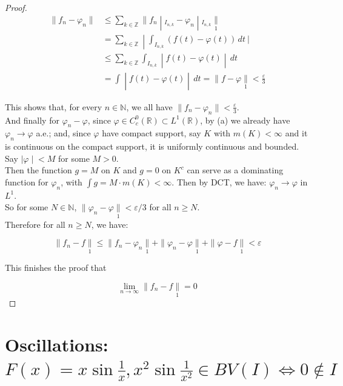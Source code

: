 \begin{proof}
\[\begin{matrix}
{\parallel f_{n} - \varphi_{n} \parallel} & \left. \leq \sum\limits_{k \in \mathbb{Z}} \parallel f_{n} \middle| {}_{I_{n,k}} - \varphi_{n} \middle| {}_{I_{n,k}}\underset{1}{\parallel} \right. \\
 & \left. = \sum\limits_{k \in \mathbb{Z}} \middle| \int_{I_{n,k}}(f(t) - \varphi(t))\, dt\ | \right. \\
 & \left. \leq \sum\limits_{k \in \mathbb{Z}}\int_{I_{n,k}} \middle| f(t) - \varphi(t) \middle| \, dt \right. \\
 & \left. = \int \middle| f(t) - \varphi(t) \middle| \, dt = \parallel f - \varphi\underset{1}{\parallel} < \frac{\varepsilon}{3} \right.
\end{matrix}\]

This shows that, for every \(n \in \mathbb{N}\), we all have \(\parallel f_{n} - \varphi_{n} \parallel < \frac{\varepsilon}{3}\).\\
And finally for \(\varphi_{n} - \varphi\), since \(\varphi \in C_{c}^{0}(\mathbb{R}) \subset L^{1}(\mathbb{R})\), by (a) we already have \(\varphi_{n}\rightarrow\varphi\) a.e.; and, since \(\varphi\) have compact support, say \(K\) with \(m(K) < \infty\) and it is continuous on the compact support, it is uniformly continuous and bounded. Say \(\left. |\varphi \middle| < M \right.\) for some \(M > 0\).\\
Then the function \(g = M\) on \(K\) and \(g = 0\) on \(K^{c}\) can serve as a dominating function for \(\varphi_{n}\), with \(\int g = M \cdot m(K) < \infty\). Then by DCT, we have: \(\varphi_{n}\rightarrow\varphi\) in \(L^{1}\).\\
So for some \(N \in \mathbb{N}\), \(\parallel \varphi_{n} - \varphi\underset{1}{\parallel} < \varepsilon/3\) for all \(n \geq N\).\\
Therefore for all \(n \geq N\), we have:

\[\parallel f_{n} - f\underset{1}{\parallel} \leq \parallel f_{n} - \varphi_{n}\underset{1}{\parallel} + \parallel \varphi_{n} - \varphi\underset{1}{\parallel} + \parallel \varphi - f\underset{1}{\parallel} < \varepsilon\]

This finishes the proof that

\[\lim\limits_{n\rightarrow\infty} \parallel f_{n} - f\underset{1}{\parallel} = 0\]

\end{proof}

\section{\texorpdfstring{Oscillations: \(F(x) = x\sin\frac{1}{x},x^{2}\sin\frac{1}{x^{2}} \in BV(I)\Leftrightarrow 0 \notin I\)}{Oscillations: F(x) = x\textbackslash sin\textbackslash frac\{1\}\{x\},x\^{}\{2\}\textbackslash sin\textbackslash frac\{1\}\{x\^{}\{2\}\} \textbackslash in BV(I)\textbackslash Leftrightarrow 0 \textbackslash notin I}}\label{oscillations-fxxsinfrac1xx2sinfrac1x2in-bvi-iff-0not-in-i}

